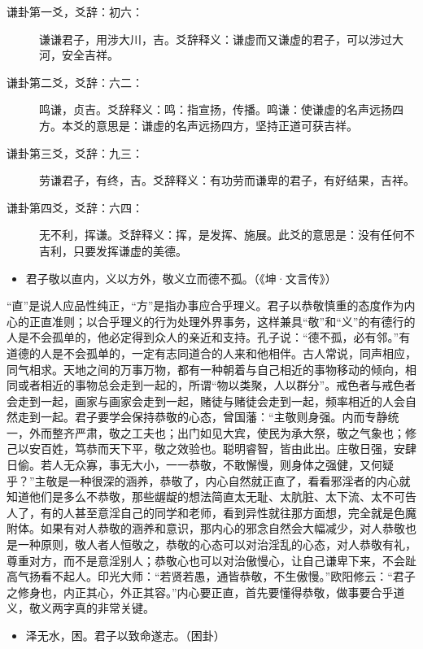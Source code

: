 \begin{description}
    \item[谦卦第一爻，爻辞：初六：] 谦谦君子，用涉大川，吉。爻辞释义：谦虚而又谦虚的君子，可以涉过大河，安全吉祥。
    \item[谦卦第二爻，爻辞：六二：] 鸣谦，贞吉。爻辞释义：鸣：指宣扬，传播。鸣谦：使谦虚的名声远扬四方。本爻的意思是：谦虚的名声远扬四方，坚持正道可获吉祥。
    \item[谦卦第三爻，爻辞：九三：] 劳谦君子，有终，吉。爻辞释义：有功劳而谦卑的君子，有好结果，吉祥。
    \item[谦卦第四爻，爻辞：六四：] 无不利，挥谦。爻辞释义：挥，是发挥、施展。此爻的意思是：没有任何不吉利，只要发挥谦虚的美德。
\end{description}

\begin{itemize}\it
    \item 君子敬以直内，义以方外，敬义立而德不孤。（《坤·文言传》）
\end{itemize}

“直”是说人应品性纯正，“方”是指办事应合乎理义。君子以恭敬慎重的态度作为内心的正直准则；以合乎理义的行为处理外界事务，这样兼具“敬”和“义”的有德行的人是不会孤单的，他必定得到众人的亲近和支持。孔子说：“德不孤，必有邻。”有道德的人是不会孤单的，一定有志同道合的人来和他相伴。古人常说，同声相应，同气相求。天地之间的万事万物，都有一种朝着与自己相近的事物移动的倾向，相同或者相近的事物总会走到一起的，所谓“物以类聚，人以群分”。戒色者与戒色者会走到一起，画家与画家会走到一起，赌徒与赌徒会走到一起，频率相近的人会自然走到一起。君子要学会保持恭敬的心态，曾国藩：“主敬则身强。内而专静统一，外而整齐严肃，敬之工夫也；出门如见大宾，使民为承大祭，敬之气象也；修己以安百姓，笃恭而天下平，敬之效验也。聪明睿智，皆由此出。庄敬日强，安肆日偷。若人无众寡，事无大小，一一恭敬，不敢懈慢，则身体之强健，又何疑乎？”主敬是一种很深的涵养，恭敬了，内心自然就正直了，看看邪淫者的内心就知道他们是多么不恭敬，那些龌龊的想法简直太无耻、太肮脏、太下流、太不可告人了，有的人甚至意淫自己的同学和老师，看到异性就往那方面想，完全就是色魔附体。如果有对人恭敬的涵养和意识，那内心的邪念自然会大幅减少，对人恭敬也是一种原则，敬人者人恒敬之，恭敬的心态可以对治淫乱的心态，对人恭敬有礼，尊重对方，而不是意淫别人；恭敬心也可以对治傲慢心，让自己谦卑下来，不会趾高气扬看不起人。印光大师：“若贤若愚，通皆恭敬，不生傲慢。”欧阳修云：“君子之修身也，内正其心，外正其容。”内心要正直，首先要懂得恭敬，做事要合乎道义，敬义两字真的非常关键。

\begin{itemize}\it
    \item 泽无水，困。君子以致命遂志。（困卦）
\end{itemize}

